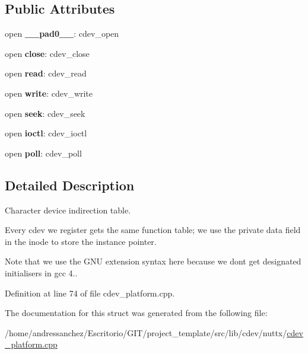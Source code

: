 \subsection*{Public Attributes}
\begin{DoxyCompactItemize}
\item 
\mbox{\label{structcdev_1_1cdev_ad78a6a0e36a5cbcb65085d9f3451434a}} 
open {\bfseries \+\_\+\+\_\+pad0\+\_\+\+\_\+}\+: cdev\+\_\+open
\item 
\mbox{\label{structcdev_1_1cdev_afa6a27c9cd18455a66b05ee250965734}} 
open {\bfseries close}\+: cdev\+\_\+close
\item 
\mbox{\label{structcdev_1_1cdev_a34d75e9dc0cb893deb2c9ba202ac38bb}} 
open {\bfseries read}\+: cdev\+\_\+read
\item 
\mbox{\label{structcdev_1_1cdev_a295f01f9ecc139d92fb45ec56ce7f0c8}} 
open {\bfseries write}\+: cdev\+\_\+write
\item 
\mbox{\label{structcdev_1_1cdev_aa82716ece1d323b301d7405dfa1d962e}} 
open {\bfseries seek}\+: cdev\+\_\+seek
\item 
\mbox{\label{structcdev_1_1cdev_aa52499d86031b563c50fbfc2ff26d45a}} 
open {\bfseries ioctl}\+: cdev\+\_\+ioctl
\item 
\mbox{\label{structcdev_1_1cdev_afa6c6db96c957ac3f213309995bedfdb}} 
open {\bfseries poll}\+: cdev\+\_\+poll
\end{DoxyCompactItemize}


\subsection{Detailed Description}
Character device indirection table.

Every cdev we register gets the same function table; we use the private data field in the inode to store the instance pointer.

Note that we use the G\+NU extension syntax here because we don\textquotesingle{}t get designated initialisers in gcc 4.. 

Definition at line 74 of file cdev\+\_\+platform.\+cpp.



The documentation for this struct was generated from the following file\+:\begin{DoxyCompactItemize}
\item 
/home/andressanchez/\+Escritorio/\+G\+I\+T/project\+\_\+template/src/lib/cdev/nuttx/\hyperlink{cdev__platform_8cpp}{cdev\+\_\+platform.\+cpp}\end{DoxyCompactItemize}
